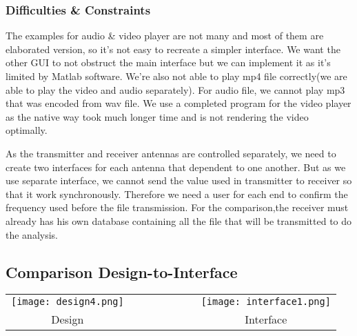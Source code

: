 \documentclass[12pt,a4paper]{article}
\begin{document}
\subsubsection{Difficulties \& Constraints}
\par \vspace{0.25cm} The examples for audio \& video player are not many and most of them are elaborated version, so it's not easy to recreate a simpler interface. We want the other GUI to not obstruct the main interface but we can implement it as it's limited by Matlab software. We're also not able to play mp4 file correctly(we are able to play the video and audio separately). For audio file, we cannot play mp3 that was encoded from wav file. We use a completed program for the video player as the native way took much longer time and is not rendering the video optimally. 
\par \vspace{0.25cm} As the transmitter and receiver antennas are controlled separately, we need to create two interfaces for each antenna that dependent to one another. But as we use separate interface, we cannot send the value used in transmitter to receiver so that it work synchronously. Therefore we need a user for each end to confirm the frequency used before the file transmission. For the comparison,the receiver must already has his own database containing all the file that will be transmitted to do the analysis.
  
\subsection{Comparison Design-to-Interface}
\begin{center}
\begin{tabular}{c r r r | r r r c}
\texttt{[image: design4.png]}&&&&&&&\texttt{[image: interface1.png]}\\
Design&&&&&&&Interface\\
\end{tabular}
\end{center}
\end{document}
